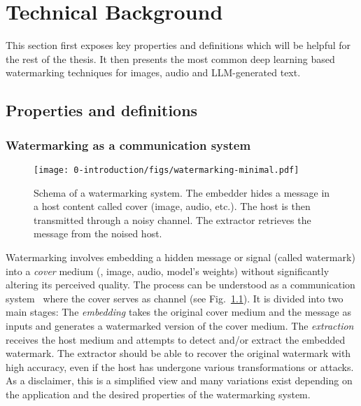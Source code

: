 
\chapter{Technical Background}
\label{chapter:technical-background}

This section first exposes key properties and definitions which will be helpful for the rest of the thesis.
It then presents the most common deep learning based watermarking techniques for images, audio and LLM-generated text.




\section{Properties and definitions}\label{chap0/sec:properties}



\subsection{Watermarking as a communication system}

\begin{figure}[b]
    \centering
    \texttt{[image: 0-introduction/figs/watermarking-minimal.pdf]}
    \caption{
        Schema of a watermarking system. 
        The embedder hides a message in a host content called cover (image, audio, etc.). 
        The host is then transmitted through a noisy channel.
        The extractor retrieves the message from the noised host.
    }\label{intro/fig:schema}
\end{figure}

Watermarking involves embedding a hidden message or signal (called watermark) into a \textit{\gls*{cover}} medium (\eg, image, audio, model's weights) without significantly altering its perceived quality. 
The process can be understood as a communication system~\citep{cover1999elements} where the cover serves as channel (see Fig.~\ref{intro/fig:schema}).
It is divided into two main stages:
The \emph{embedding} takes the original cover medium and the message as inputs and generates a watermarked version of the cover medium. 
The \emph{extraction} receives the host medium and attempts to detect and/or extract the embedded watermark. 
The extractor should be able to recover the original watermark with high accuracy, even if the host has undergone various transformations or attacks.
As a disclaimer, this is a simplified view and many variations exist depending on the application and the desired properties of the watermarking system.




